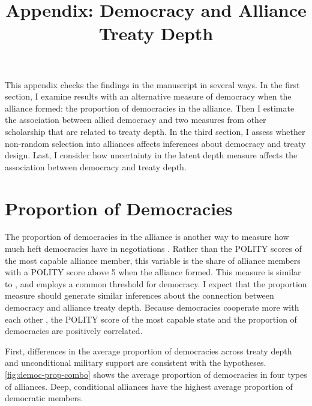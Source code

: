 \documentclass[12pt]{article}
\title{\textbf{Appendix: Democracy and Alliance Treaty Depth}}
\author{}
\date{}
\begin{document}
\maketitle 

\doublespace 

This appendix checks the findings in the manuscript in several ways. 
In the first section, I examine results with an alternative measure of democracy when the alliance formed: the proportion of democracies in the alliance. 
Then I estimate the association between allied democracy and two measures from other scholarship that are related to treaty depth.
In the third section, I assess whether non-random selection into alliances affects inferences about democracy and treaty design.   
Last, I consider how uncertainty in the latent depth measure affects the association between democracy and treaty depth. 


\section{Proportion of Democracies}


The proportion of democracies in the alliance is another way to measure how much heft democracies have in negotiations \cite{Chibaetal2015}.  
Rather than the POLITY scores of the most capable alliance member, this variable is the share of alliance members with a POLITY score above 5 when the alliance formed. 
This measure is similar to \citet{Chibaetal2015}, and employs a common threshold for democracy. 
I expect that the proportion measure should generate similar inferences about the connection between democracy and alliance treaty depth.
Because democracies cooperate more with each other \citep{Leeds1999}, the POLITY score of the most capable state and the proportion of democracies are positively correlated. 


First, differences in the average proportion of democracies across treaty depth and unconditional military support are consistent with the hypotheses. 
\autoref{fig:democ-prop-combo} shows the average proportion of democracies in four types of alliances. 
Deep, conditional alliances have the highest average proportion of democratic members.
\end{document}
